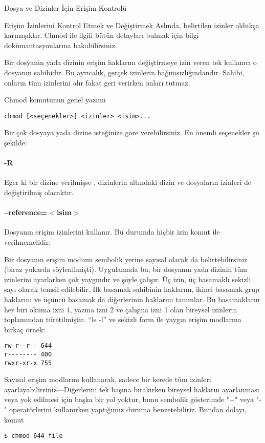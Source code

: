 \begin{section}{Dosya ve Dizinler İçin Erişim Kontrolü}
\begin{subsection}{Erişim İzinlerini Kontrol Etmek ve Değiştirmek}
Aslında, belirtilen izinler oldukça karmaşıktır. Chmod ile ilgili bütün detayları bulmak için bilgi dokümantasyonlarına bakabilirsiniz.

Bir dosyanin yada dizinin erişim haklarını değiştirmeye izin veren tek kullanıcı o dosyanın sahibidir. Bu ayrıcalık, gerçek izinlerin bağımsızlığındandır. Sahibi, onların tüm izinlerini alır fakat geri verirken onları tutmaz.

Chmod komutunun genel yazımı
\begin{verbatim}
chmod [<seçenekler>] <izinler> <isim>...
\end{verbatim}

Bir çok dosyaya yada dizine isteğinize göre verebilirsiniz. En önemli seçenekler şu şekilde:
\paragraph{-R}{Eğer ki bir dizine verilmişse , dizinlerin altındaki dizin ve dosyaların izinleri de değiştirilmiş olacaktır.}
\paragraph{--reference=$<$isim$>$}{Dosyanın erişim izinlerini kullanır. Bu durumda hiçbir izin komut ile verilmemelidir.}

Bir dosyanın erişim modunu sembolik yerine sayısal olarak da belirtebilirsiniz (biraz yukarda söylenilmişti). Uygulamada bu, bir dosyanın yada dizinin tüm izinlerini ayarlarken çok yaygındır ve şöyle çalışır. Üç izin, üç basamaklı sekizli sayı olarak temsil edilebilir. İlk basamak sahibinin haklarını, ikinci basamak grup haklarını ve üçüncü basamak da diğerlerinin haklarını tanımlar. Bu basamakların her biri okuma izni 4, yazma izni 2 ve çalışma izni 1 olan bireysel izinlerin toplamından türetilmiştir. “ls -l” ve sekizli form ile yaygın erişim modlarına birkaç örnek:
\begin{verbatim}
rw-r--r-- 644
r-------- 400
rwxr-xr-x 755
\end{verbatim}

Sayısal erişim modlarını kullanarak, sadece bir kerede tüm izinleri ayarlayabilirsiniz—Diğerlerini tek başına bırakırken bireysel hakların ayarlanması veya yok edilmesi için başka bir yol yoktur, bunu sembolik gösterimde "+" veya "-" operatörlerini kullanırken yaptığımız duruma benzetebiliriz. Bundan dolayı, komut
\begin{verbatim}
$ chmod 644 file
\end{verbatim}


\end{subsection}
\end{section}
